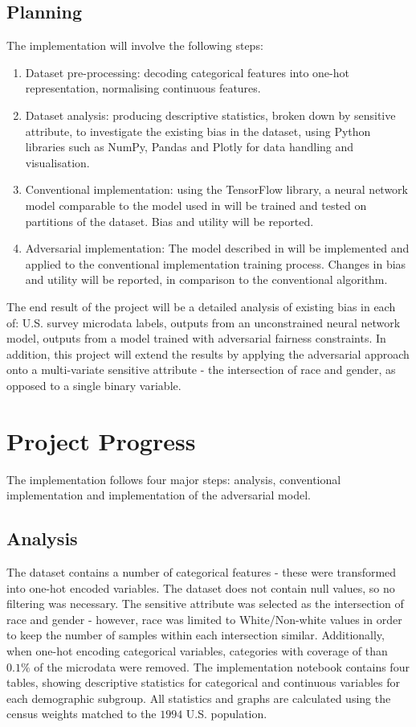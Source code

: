\documentclass[conference]{IEEEtran}
\begin{document}
\subsection{Planning}
The implementation will involve the following steps:
\begin{enumerate}
    \item Dataset pre-processing: decoding categorical features into one-hot representation, normalising continuous features.
    \item Dataset analysis: producing descriptive statistics, broken down by sensitive attribute, to investigate the existing bias in the dataset, using Python libraries such as NumPy, Pandas and Plotly for data handling and visualisation.
    \item Conventional implementation: using the TensorFlow\cite{tensorflow2015-whitepaper} library, a neural network model comparable to the model used in \cite{Adel_Valera_Ghahramani_Weller_2019} will be trained and tested on partitions of the dataset. Bias and utility will be reported.
    \item Adversarial implementation: The model described in \cite{DBLP:journals/corr/abs-1802-06309} will be implemented and applied to the conventional implementation training process. Changes in bias and utility will be reported, in comparison to the conventional algorithm.
\end{enumerate}
The end result of the project will be a detailed analysis of existing bias in each of: U.S. survey microdata labels, outputs from an unconstrained neural network model, outputs from a model trained with adversarial fairness constraints. In addition, this project will extend the results by applying the adversarial approach onto a multi-variate sensitive attribute - the intersection of race and gender, as opposed to a single binary variable.
\section{Project Progress}
The implementation follows four major steps: analysis, conventional implementation and implementation of the adversarial model.
\subsection{Analysis}
The dataset contains a number of categorical features - these were transformed into one-hot encoded variables. The dataset does not contain null values, so no filtering was necessary. The sensitive attribute was selected as the intersection of race and gender - however, race was limited to White/Non-white values in order to keep the number of samples within each intersection similar. Additionally, when one-hot encoding categorical variables, categories with coverage of than $0.1\%$ of the microdata were removed. The implementation notebook contains four tables, showing descriptive statistics for categorical and continuous variables for each demographic subgroup. All statistics and graphs are calculated using the census weights matched to the $1994$ U.S. population.
\end{document}

